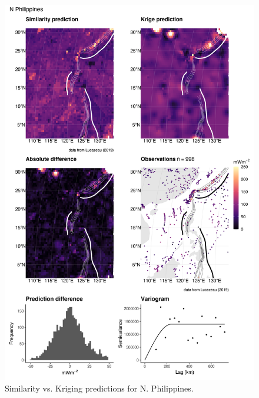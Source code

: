 \documentclass[draft,linenumbers]{agujournal2018}
\begin{document}
\begin{figure}[h]

{\centering \includegraphics[width=0.95\linewidth,]{../figs/diff/comp/N_Philippines} 

}

\caption{Similarity vs. Kriging predictions for N. Philippines.}\label{fig:n.philippines.comp}
\end{figure}
\end{document}
